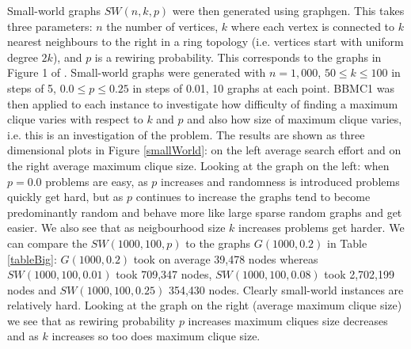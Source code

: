 \documentclass{l4proj}
\begin{document}
Small-world graphs $SW(n,k,p)$ were then generated using graphgen. This takes three parameters: $n$ the number of vertices, $k$ where each vertex
is connected to $k$ nearest neighbours to the right in a ring topology (i.e. vertices start with uniform degree $2k$), and $p$ is a 
rewiring probability. This corresponds to the
graphs in Figure 1 of \cite{smallWorld}. Small-world graphs were generated with $n = 1,000$, $50 \leq k \leq 100$ in steps of 5,
$0.0 \leq p \leq 0.25$ in steps of 0.01, 10 graphs at each point. BBMC1 was then applied to each instance to investigate
how difficulty of finding a maximum clique varies with respect to $k$ and $p$ and also how size of maximum clique varies,
i.e. this is an investigation of the problem.
The results are shown as three dimensional plots in Figure \ref{smallWorld}: on the left average search effort and on the right
average maximum clique size. Looking at the graph on the left: when $p = 0.0$ problems are easy, as $p$ increases and randomness
is introduced problems quickly get hard, but as $p$ continues to increase the graphs tend to become predominantly random 
and behave more like large sparse random graphs and get easier. We also see that as neigbourhood size $k$ increases problems get harder. We
can compare the $SW(1000,100,p)$ to the graphs $G(1000,0.2)$ in Table \ref{tableBig}: $G(1000,0.2)$ took on
average 39,478 nodes whereas $SW(1000,100,0.01)$ took 709,347 nodes, $SW(1000,100,0.08)$ took 2,702,199 nodes and 
$SW(1000,100,0.25)$ 354,430 nodes. Clearly small-world instances are relatively hard. Looking at the graph on the right (average maximum clique size)
we see that as rewiring probability $p$ increases maximum cliques size decreases and as $k$ increases so too does maximum clique size.
\end{document}
